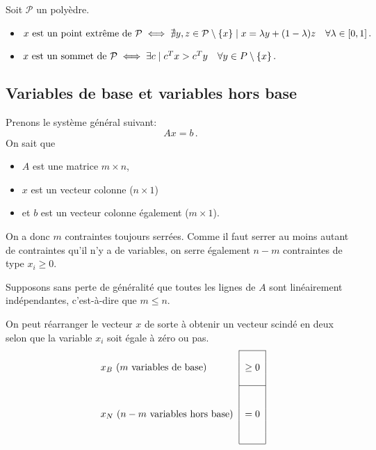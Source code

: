 	Soit $\mathcal{P}$ un polyèdre.

	\begin{itemize}
		\item $\textnormal{$x$ est un point extrême de $\mathcal{P}$}
		\iff \nexists y,z \in \mathcal{P} \setminus \{x\} \suchthat x = \lambda y + (1 - \lambda) z
		\quad \forall \lambda \in \interval{0}{1}\,.$
		\item $\textnormal{$x$ est un sommet de $\mathcal{P}$}
		\iff \exists c \suchthat c^T x > c^T y
		\quad \forall y \in P \setminus \{x\} \,.$
	\end{itemize}

\subsection{Variables de base et variables hors base}

	Prenons le système général suivant:
	\[
	Ax = b\,.
	\]
	On sait que

	\begin{itemize}
		\item $A$ est une matrice $m \times n$,
		\item $x$ est un vecteur colonne ($n \times 1$)
		\item et $b$ est un vecteur colonne également ($m \times 1$).
	\end{itemize}

	On a donc $m$ contraintes toujours serrées.
	Comme il faut serrer au moins autant de contraintes
	qu'il n'y a de variables,
	on serre également $n-m$ contraintes de type $x_i \ge 0$.

	Supposons sans perte de généralité que toutes les lignes de $A$
	sont linéairement indépendantes,
	c'est-à-dire que $m \le n$.

	On peut réarranger le vecteur $x$ de sorte à obtenir
	un vecteur scindé en deux selon que
	la variable $x_i$ soit égale à zéro ou pas.
	\[
	\begin{tabular}{l|c|}
		\cline{2-2}
		\multirow{3}{*}{$\xb$ ($m$ variables de base)} & \multirow{3}{*}{$\ge 0$}\\
		& \\
		& \\
		\cline{2-2}
		\multirow{5}{*}{$\xn$ ($n-m$ variables hors base)} & \multirow{5}{*}{$= 0$}\\
		& \\
		& \\
		& \\
		& \\
		\cline{2-2}
	\end{tabular}
	\]


